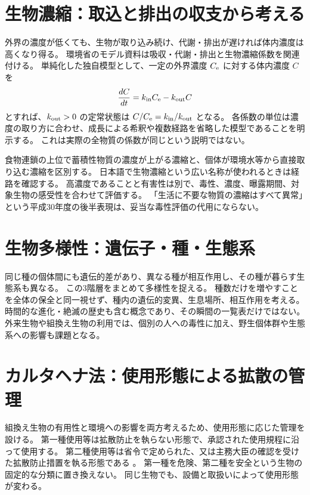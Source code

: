 \section{生物濃縮：取込と排出の収支から考える}
\label{theory:environment:accumulation}
外界の濃度が低くても、生物が取り込み続け、代謝・排出が遅ければ体内濃度は高くなり得る。
環境省のモデル資料は吸収・代謝・排出と生物濃縮係数を関連付ける\cite{env_accumulation}。
単純化した独自模型として、一定の外界濃度 \(C_{\rm e}\) に対する体内濃度 \(C\) を
\[
 \frac{dC}{dt}=k_{\rm in}C_{\rm e}-k_{\rm out}C
\]
とすれば、\(k_{\rm out}>0\) の定常状態は \(C/C_{\rm e}=k_{\rm in}/k_{\rm out}\) となる。
各係数の単位は濃度の取り方に合わせ、成長による希釈や複数経路を省略した模型であることを明示する。
これは実際の全物質の係数が同じという説明ではない。

食物連鎖の上位で蓄積性物質の濃度が上がる濃縮と、個体が環境水等から直接取り込む濃縮を区別する。
日本語で生物濃縮という広い名称が使われるときは経路を確認する\cite{env_foodchain}。
高濃度であることと有害性は別で、毒性、濃度、曝露期間、対象生物の感受性を合わせて評価する。
「生活に不要な物質の濃縮はすべて異常」という平成30年度の後半表現は、妥当な毒性評価の代用にならない。

\section{生物多様性：遺伝子・種・生態系}
\label{theory:environment:biodiversity}
同じ種の個体間にも遺伝的差があり、異なる種が相互作用し、その種が暮らす生態系も異なる。
この3階層をまとめて多様性を捉える\cite{env_biodiversity}。
種数だけを増やすことを全体の保全と同一視せず、種内の遺伝的変異、生息場所、相互作用を考える。
時間的な進化・絶滅の歴史も含む概念であり、その瞬間の一覧表だけではない。
外来生物や組換え生物の利用では、個別の人への毒性に加え、野生個体群や生態系への影響も課題となる。

\section{カルタヘナ法：使用形態による拡散の管理}
\label{theory:environment:biosafety}
組換え生物の有用性と環境への影響を両方考えるため、使用形態に応じた管理を設ける。
第一種使用等は拡散防止を執らない形態で、承認された使用規程に沿って使用する。
第二種使用等は省令で定められた、又は主務大臣の確認を受けた拡散防止措置を執る形態である
\cite{env_biosafety_law}。
第一種を危険、第二種を安全という生物の固定的な分類に置き換えない。
同じ生物でも、設備と取扱いによって使用形態が変わる。


